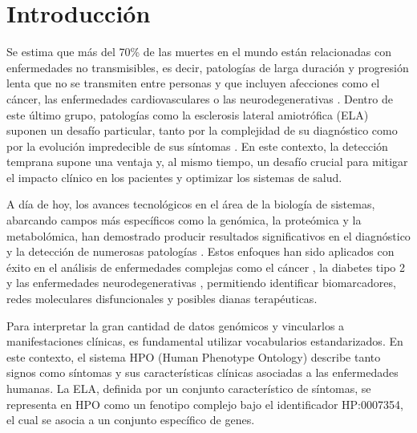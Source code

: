 \section{Introducción}
Se estima que más del 70\% de las muertes en el mundo están relacionadas con enfermedades no transmisibles, es decir, patologías de larga duración y progresión lenta que no se transmiten entre personas y que incluyen afecciones como el cáncer, las enfermedades cardiovasculares o las neurodegenerativas \cite{who2023}. Dentro de este último grupo, patologías como la esclerosis lateral amiotrófica (ELA) suponen un desafío particular, tanto por la complejidad de su diagnóstico como por la evolución impredecible de sus síntomas \cite{Hardiman2017}. En este contexto, la detección temprana supone una ventaja y, al mismo tiempo, un desafío crucial para mitigar el impacto clínico en los pacientes y optimizar los sistemas de salud. 

A día de hoy, los avances tecnológicos en el área de la biología de sistemas, abarcando campos más específicos como la genómica, la proteómica y la metabolómica, han demostrado producir resultados significativos en el diagnóstico y la detección de numerosas patologías \cite{Kitano2002}. Estos enfoques han sido aplicados con éxito en el análisis de enfermedades complejas como el cáncer \cite{Barabasi2011}, la diabetes tipo 2 \cite{Nielsen2017} y las enfermedades neurodegenerativas \cite{Tian2022}, permitiendo identificar biomarcadores, redes moleculares disfuncionales y posibles dianas terapéuticas.

Para interpretar la gran cantidad de datos genómicos y vincularlos a manifestaciones clínicas, es fundamental utilizar vocabularios estandarizados. En este contexto, el sistema HPO (Human Phenotype Ontology) \cite{hpo2025} describe tanto signos como síntomas y sus características clínicas asociadas a las enfermedades humanas. La ELA, definida por un conjunto característico de síntomas, se representa en HPO como un fenotipo complejo bajo el identificador HP:0007354, el cual se asocia a un conjunto específico de genes.

